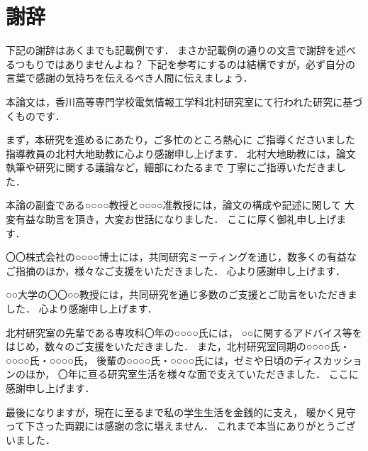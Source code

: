 \chapter{謝辞}

下記の謝辞はあくまでも記載例です．
まさか記載例の通りの文言で謝辞を述べるつもりではありませんよね？
下記を参考にするのは結構ですが，必ず自分の言葉で感謝の気持ちを伝えるべき人間に伝えましょう．

本論文は，香川高等専門学校電気情報工学科北村研究室にて行われた研究に基づくものです．

まず，本研究を進めるにあたり，ご多忙のところ熱心に
ご指導くださいました指導教員の北村大地助教に心より感謝申し上げます．
北村大地助教には，論文執筆や研究に関する議論など，細部にわたるまで
丁寧にご指導いただきました．

本論の副査である○○○○教授と○○○○准教授には，論文の構成や記述に関して
大変有益な助言を頂き，大変お世話になりました．
ここに厚く御礼申し上げます．

〇〇株式会社の○○○○博士には，共同研究ミーティングを通じ，数多くの有益な
ご指摘のほか，様々なご支援をいただきました．
心より感謝申し上げます．

○○大学の〇〇○○教授には，共同研究を通じ多数のご支援とご助言をいただきました．
心より感謝申し上げます．

北村研究室の先輩である専攻科〇年の○○○○氏には，
○○に関するアドバイス等をはじめ，数々のご支援をいただきました．
また，北村研究室同期の○○○○氏・○○○○氏・○○○○氏，
後輩の○○○○氏・○○○○氏には，ゼミや日頃のディスカッションのほか，
〇年に亘る研究室生活を様々な面で支えていただきました．
ここに感謝申し上げます．

最後になりますが，現在に至るまで私の学生生活を金銭的に支え，
暖かく見守って下さった両親には感謝の念に堪えません．
これまで本当にありがとうございました．
